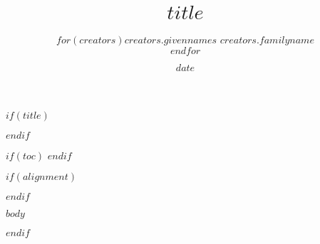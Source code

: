 \documentclass[$if(fontsize)$$fontsize$,$endif$$for(classoption)$$classoption$$sep$,$endfor$]{$documentclass$}
\title{$title$}
\date{$date$}
\author{$for(creators)$$creators.givennames$ \textsc{$creators.familyname$}\\$endfor$}
\begin{document}
$if(title)$
\maketitle
$endif$


$if(toc)$
\tableofcontents
$endif$


$if(alignment)$
\begin{$alignment$}
$endif$

$body$

\end{$alignment$}
$endif$
\end{document}
